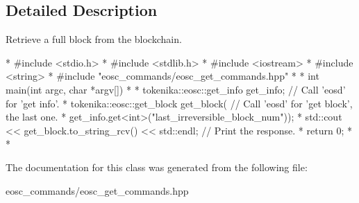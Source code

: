 \subsection{Detailed Description}
Retrieve a full block from the blockchain. 

\begin{DoxyVerb}* #include <stdio.h>
* #include <stdlib.h>
* #include <iostream>
* #include <string>
* #include "eosc_commands/eosc_get_commands.hpp"
* 
* int main(int argc, char *argv[])
* {
* tokenika::eosc::get_info get_info; // Call 'eosd' for 'get info'.
* tokenika::eosc::get_block get_block( // Call 'eosd' for 'get block', the last one.
* get_info.get<int>("last_irreversible_block_num"));
* std::cout << get_block.to_string_rcv() << std::endl; // Print the response.
* return 0;
* }
* \end{DoxyVerb}
 

The documentation for this class was generated from the following file\+:\begin{DoxyCompactItemize}
\item 
eosc\+\_\+commands/eosc\+\_\+get\+\_\+commands.\+hpp\end{DoxyCompactItemize}
